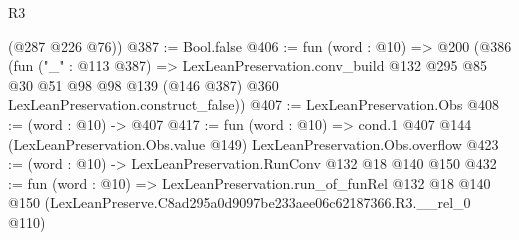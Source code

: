 \begin{lexlean}{R3}
\begin{coremodule}
      (@287 @226 @76))
@387 := Bool.false
@406 := fun (word : @10) =>
  @200
    (@386
      (fun ("_" : @113 @387) =>
      LexLeanPreservation.conv_build
        @132
        @295
        @85
        @30
        @51
        @98
        @98
        @139
        (@146 @387)
        @360
        LexLeanPreservation.construct_false))
@407 := LexLeanPreservation.Obs
@408 := (word : @10) -> @407
@417 := fun (word : @10) =>
  cond.{1} @407 @144 (LexLeanPreservation.Obs.value @149) LexLeanPreservation.Obs.overflow
@423 := (word : @10) -> LexLeanPreservation.RunConv @132 @18 @140 @150
@432 := fun (word : @10) =>
  LexLeanPreservation.run_of_funRel
    @132
    @18
    @140
    @150
    (LexLeanPreserve.C8ad295a0d9097be233aee06c62187366.R3.__rel_0 @110)
\end{coremodule}
\end{lexlean}
